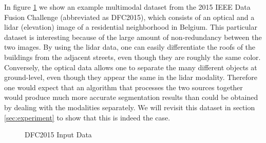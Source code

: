 \documentclass[journal]{IEEEtran}
\begin{document}
In figure \ref{fig:DFC2015fig1} we show an example multimodal dataset from the 2015
IEEE Data Fusion Challenge \cite{7536139} (abbreviated as DFC2015), which consists of
an optical and a lidar (elevation) image of a residential neighborhood in
Belgium. This particular dataset is interesting because of the large amount of
non-redundancy between the two images. By using the lidar data, one can easily
differentiate the roofs of the buildings from the adjacent streets, even though
they are roughly the same color. Conversely, the optical data allows one to
separate the many different objects at ground-level, even though they appear the
same in the lidar modality. Therefore one would expect that an algorithm that
processes the two sources together would produce much more accurate segmentation
results than could be obtained by dealing with the modalities separately.  We
will revisit this dataset in section \ref{sec:experiment} to show that this is
indeed the case.

\begin{figure}[!t]
  \centering {}%
  \hfil %
  \caption{DFC2015 Input Data}
  \label{fig:DFC2015fig1}
\end{figure}
\end{document}
